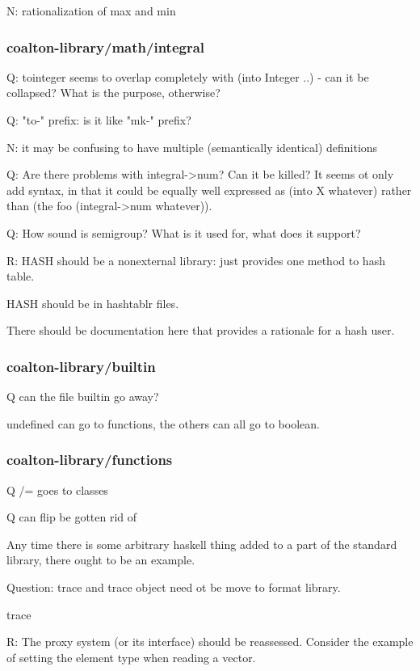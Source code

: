 \documentclass[12pt]{article}
\begin{document}
N: rationalization of max and min

\subsubsection{coalton-library/math/integral}

Q: tointeger seems to overlap completely with (into Integer ..)
- can it be collapsed? What is the purpose, otherwise?

Q: "to-" prefix: is it like "mk-" prefix?

N: it may be confusing to have multiple (semantically identical)
definitions

Q: Are there problems with integral->num? Can it be killed? It seems
ot only add syntax, in that it could be equally well expressed as
(into X whatever) rather than (the foo (integral->num whatever)).

Q: How sound is semigroup? What is it used for, what does it support?

R: HASH should be a nonexternal library: just provides one method to hash table.

HASH should be in hashtablr files.

There should be documentation here that provides a rationale for a hash user.

\subsubsection{coalton-library/builtin}

Q can the file builtin go away?

undefined can go to functions, the others can all go to boolean.

\subsubsection{coalton-library/functions}

Q /= goes to classes

Q can flip be gotten rid of

Any time there is some arbitrary haskell thing added to a part of the
standard library, there ought to be an example.

Question: trace and trace object need ot be move to format library.

trace

R: The proxy system (or its interface) should be reassessed. Consider
the example of setting the element type when reading a vector.
\end{document}
